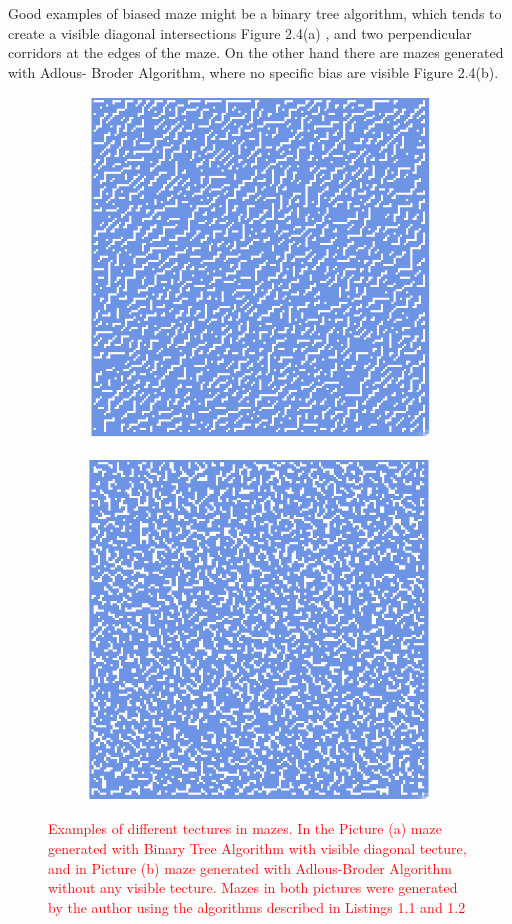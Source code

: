 Good examples of biased maze might be a binary tree algorithm, which tends to create a visible diagonal intersections Figure 2.4(a) , and two perpendicular corridors at the edges of the maze. On the other hand there are mazes generated  with Adlous- Broder Algorithm, where no specific bias are visible Figure 2.4(b).
\newline
\begin{figure}[!h]
    \centering
    \begin{subfigure}{.5\textwidth}
    \centering
    \includegraphics[width=.5\linewidth]{binarybias}
    \caption{}
    \label{fig:sub1}
    \end{subfigure}%
    \begin{subfigure}{.5\textwidth}
    \centering
    \includegraphics[width=.5\linewidth]{aldousbias}
    \caption{}
    \label{fig:sub2}
    \end{subfigure}
    \caption{\textcolor{red}{Examples of different tectures in mazes. In the Picture (a) maze generated with  Binary Tree Algorithm with visible diagonal tecture, and in Picture (b) maze generated with Adlous-Broder Algorithm without any visible tecture. Mazes in both pictures were generated by the author using the algorithms described in Listings 1.1 and 1.2}}
    \label{fig:test}
    \end{figure}

